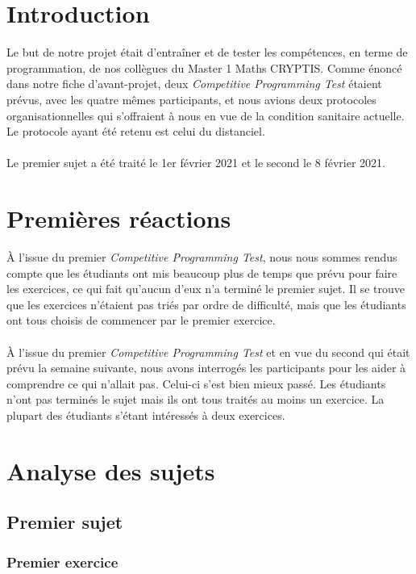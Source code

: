 \documentclass[12pt]{article}
\begin{document}
\tableofcontents
\pagebreak

\section{Introduction}
Le but de notre projet était d'entraîner et de tester les compétences, en terme de programmation, de nos collègues du \textsf{Master 1 Maths CRYPTIS}. Comme énoncé dans notre fiche d'avant-projet, deux \textsl{Competitive Programming Test} étaient prévus, avec les quatre mêmes participants, et nous avions deux protocoles organisationnelles qui s'offraient à nous en vue de la condition sanitaire actuelle. Le protocole ayant été retenu est celui du distanciel.\\
\\
Le premier sujet a été traité le 1er février 2021 et le second le 8 février 2021.

\vfill \eject

\section{Premières réactions}
À l'issue du premier \textsl{Competitive Programming Test}, nous nous sommes rendus compte que les étudiants ont mis beaucoup plus de temps que prévu pour faire les exercices, ce qui fait qu'aucun d'eux n'a terminé le premier sujet. Il se trouve que les exercices n'étaient pas triés par ordre de difficulté, mais que les étudiants ont tous choisis de commencer par le premier exercice.\\\\
À l'issue du premier \textsl{Competitive Programming Test} et en vue du second  qui était prévu la semaine suivante, nous avons interrogés les participants pour les aider à comprendre ce qui n'allait pas. Celui-ci s'est bien mieux passé. Les étudiants n'ont pas terminés le sujet mais ils ont tous traités au moins un exercice. La plupart des étudiants s'étant intéressés à deux exercices.

\section{Analyse des sujets}
\subsection{Premier sujet}
\subsubsection{Premier exercice}
\end{document}

